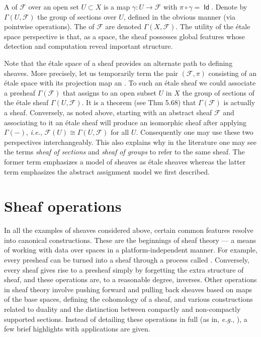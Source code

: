 \documentclass{psapm-l}
\theoremstyle{definition}
\theoremstyle{remark}
\numberwithin{equation}{section}
\begin{document}
A {{}} of ${{\mathcal F}}$ over an open set $U\subset X$ is a map ${{\gamma}}:U\to{{\mathcal F}}$ with ${{\pi}}\circ{{\gamma}} = {{{\operatorname{\mathsf{{Id}}}}}}$. Denote by $\Gamma(U,{{\mathcal F}})$ the group of sections over $U$, defined in the obvious manner (via pointwise operations). The {{}} of ${{\mathcal F}}$ are denoted $\Gamma(X,{{\mathcal F}})$. The utility of the \'etale space perspective is that, as a space, the sheaf possesses global features whose detection and computation reveal important structure.

Note that the \'etale space of a sheaf provides an alternate path to defining sheaves. More precisely, let us temporarily term the pair $({{\mathcal F}},{{\pi}})$ consisting of an \'etale space with its projection map an {{}}. To such an \'etale sheaf we could associate a presheaf $\Gamma({{\mathcal F}})$ that assigns to an open subset $U$ in $X$ the group of sections of the \'etale sheaf $\Gamma(U,{{\mathcal F}})$. It is a theorem (see \cite{Rotman} Thm 5.68) that $\Gamma({{\mathcal F}})$ is actually a sheaf. Conversely, as noted above, starting with an abstract sheaf ${{\mathcal F}}$ and associating to it an \'etale sheaf will produce an isomorphic sheaf after applying $\Gamma(-)$, {{\em i.e.}}, ${{\mathcal F}}(U)\cong\Gamma(U,{{\mathcal F}})$ for all $U$. Consequently one may use these two perspectives interchangeably. This also explains why in the literature one may see the terms {\em sheaf of sections} and {\em sheaf of groups} to refer to the same sheaf. The former term emphasizes a model of sheaves as \'etale sheaves whereas the latter term emphasizes the abstract assignment model we first described.

\section{Sheaf operations}
\label{sec:shops}

In all the examples of sheaves considered above, certain common features resolve into canonical constructions. These are the beginnings of sheaf theory --- a means of working with data over spaces in a platform-independent manner. For example, every presheaf can be turned into a sheaf through a process called {{}} \cite{Bredon}. Conversely, every sheaf gives rise to a presheaf simply by forgetting the extra structure of sheaf, and these operations are, to a reasonable degree, inverses. Other operations in sheaf theory involve pushing forward and pulling back sheaves based on maps of the base spaces, defining the cohomology of a sheaf, and various constructions related to duality and the distinction between compactly and non-compactly supported sections. Instead of detailing these operations in full (as in, {{\em e.g.}}, \cite{Godemont,Bredon}), a few brief highlights with applications are given.
\end{document}
